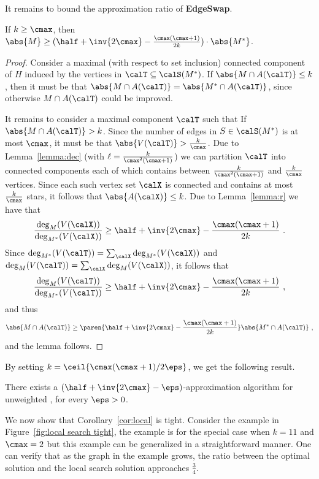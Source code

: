 
It remains to bound the approximation ratio of \textbf{EdgeSwap}.

\begin{lemma}
If $k \geq \cmax$, then $\abs{M} \geq (\half + \inv{2\cmax}
- \frac{\cmax(\cmax+1)}{2k}) \cdot \abs{M^*}$.
\end{lemma}
\begin{proof}
Consider a maximal (with respect to set inclusion) connected component
of $H$ induced by the vertices in $\calT \subseteq \calS(M^*)$.
%
If $\abs{M \cap A(\calT)} \leq k$, then it must be that $\abs{M \cap
A(\calT)} = \abs{M^* \cap A(\calT)}$, since otherwise $M \cap
A(\calT)$ could be improved.

It remains to consider a maximal component $\calT$ such that If
$\abs{M \cap A(\calT)} > k$.  Since the number of edges in
$S \in \calS(M^*)$ is at most $\cmax$, it must be that $\abs{V(\calT)}
> \frac{k}{\cmax}$.
%
Due to Lemma~\ref{lemma:dec} (with $\ell
= \frac{k}{\cmax^2(\cmax+1)}$) we can partition $\calT$ into connected
components each of which contains between $\frac{k}{\cmax^2(\cmax+1)}$
and $\frac{k}{\cmax}$ vertices.
%
Since each such vertex set $\calX$ is connected and contains at most
$\frac{k}{\cmax}$ stars, it follows that $\abs{A(\calX)} \leq k$.
%
Due to Lemma~\ref{lemma:r} we have that
\[
\frac{\deg_M(V(\calX))}{\deg_{M^*}(V(\calX))} 
\geq \half + \inv{2\cmax} - \frac{\cmax(\cmax+1)}{2k}
~.
\]
Since $\deg_{M^*}(V(\calT)) = \sum_{\calX} \deg_{M^*}(V(\calX))$ and
$\deg_M(V(\calT)) = \sum_{\calX} \deg_M(V(\calX))$, it follows that
\[
\frac{\deg_M(V(\calT))}{\deg_{M^*}(V(\calT))}
\geq \half + \inv{2\cmax} - \frac{\cmax(\cmax+1)}{2k}
~,
\]
and thus
\[
\abs{M \cap A(\calT)}
\geq \paren{ \half + \inv{2\cmax} -
             \frac{\cmax(\cmax+1)}{2k}} \abs{M^* \cap A(\calT)}
~,
\]
and the lemma follows.
\end{proof}

By setting $k = \ceil{\cmax(\cmax+1)/2\eps}$, we get the following
result.

\begin{corollary}
\label{cor:local}
There exists a $(\half + \inv{2\cmax} - \eps)$-approximation algorithm
for unweighted \carpool, for every $\eps>0$.
\end{corollary}


We now show that Corollary~\ref{cor:local} is tight.  Consider the
example in Figure~\ref{fig:local search tight}, the example is for the
special case when $k = 11$ and $\cmax = 2$ but this example can be
generalized in a straightforward manner.  One can verify that as the
graph in the example grows, the ratio between the optimal solution
and the local search solution approaches $\frac{3}{4}$.

